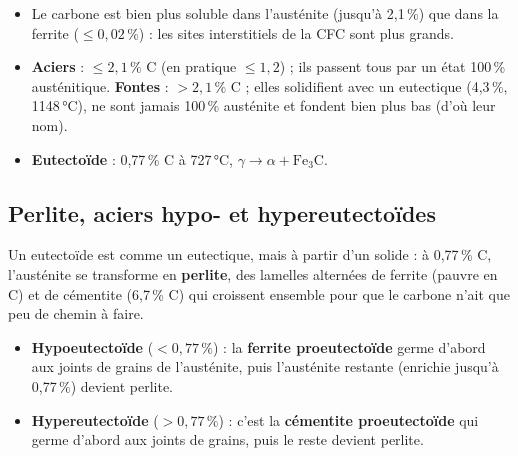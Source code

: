 
\begin{propbox}[title={Lire le diagramme Fe--C}]
\begin{itemize}
  \item Le carbone est bien plus soluble dans l'austénite (jusqu'à 2,1\,\%) que dans la
        ferrite ($\le 0{,}02\,\%$) : les sites interstitiels de la CFC sont plus grands.
  \item \textbf{Aciers} : $\le 2{,}1\,\%$ C (en pratique $\le 1{,}2$) ; ils passent tous par un
        état 100\,\% austénitique. \textbf{Fontes} : $> 2{,}1\,\%$ C ; elles solidifient avec un
        eutectique (4,3\,\%, 1148\,°C), ne sont jamais 100\,\% austénite et fondent bien plus bas
        (d'où leur nom).
  \item \textbf{Eutectoïde} : 0,77\,\% C à 727\,°C, $\gamma \to \alpha + \text{Fe}_3\text{C}$.
\end{itemize}
\end{propbox}

\subsection*{Perlite, aciers hypo- et hypereutectoïdes}


Un eutectoïde est comme un eutectique, mais à partir d'un solide : à 0,77\,\% C, l'austénite se
transforme en \textbf{perlite}, des lamelles alternées de ferrite (pauvre en C) et de cémentite
(6,7\,\% C) qui croissent ensemble pour que le carbone n'ait que peu de chemin à faire.
\begin{itemize}
  \item \textbf{Hypoeutectoïde} ($< 0{,}77\,\%$) : la \textbf{ferrite proeutectoïde} germe d'abord
        aux joints de grains de l'austénite, puis l'austénite restante (enrichie jusqu'à 0,77\,\%)
        devient perlite.
  \item \textbf{Hypereutectoïde} ($> 0{,}77\,\%$) : c'est la \textbf{cémentite proeutectoïde} qui
        germe d'abord aux joints de grains, puis le reste devient perlite.
\end{itemize}


